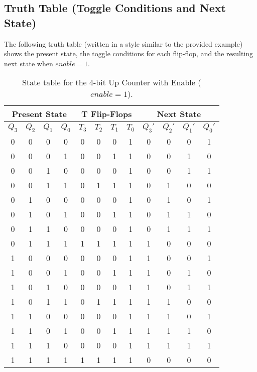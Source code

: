 \documentclass[11pt]{article}
\begin{document}
\subsection{Truth Table (Toggle Conditions and Next State)}
The following truth table (written in a style similar to the provided example) shows the present state, the toggle conditions for each flip-flop, and the resulting next state when \({enable}=1\).

\bigskip

\begin{table}[H]
\centering
\begin{tabular}{|c|c|c|c||c|c|c|c||c|c|c|c|}
\hline
\multicolumn{4}{|c||}{Present State} & \multicolumn{4}{c||}{T Flip-Flops} & \multicolumn{4}{c|}{Next State} \\
\hline
\(Q_3\) & \(Q_2\) & \(Q_1\) & \(Q_0\) & \(T_3\) & \(T_2\) & \(T_1\) & \(T_0\) & \(Q_3'\) & \(Q_2'\) & \(Q_1'\) & \(Q_0'\) \\
\hline
0 & 0 & 0 & 0 & 0 & 0 & 0 & 1 & 0 & 0 & 0 & 1 \\
\hline
0 & 0 & 0 & 1 & 0 & 0 & 1 & 1 & 0 & 0 & 1 & 0 \\
\hline
0 & 0 & 1 & 0 & 0 & 0 & 0 & 1 & 0 & 0 & 1 & 1 \\
\hline
0 & 0 & 1 & 1 & 0 & 1 & 1 & 1 & 0 & 1 & 0 & 0 \\
\hline
0 & 1 & 0 & 0 & 0 & 0 & 0 & 1 & 0 & 1 & 0 & 1 \\
\hline
0 & 1 & 0 & 1 & 0 & 0 & 1 & 1 & 0 & 1 & 1 & 0 \\
\hline
0 & 1 & 1 & 0 & 0 & 0 & 0 & 1 & 0 & 1 & 1 & 1 \\
\hline
0 & 1 & 1 & 1 & 1 & 1 & 1 & 1 & 1 & 0 & 0 & 0 \\
\hline
1 & 0 & 0 & 0 & 0 & 0 & 0 & 1 & 1 & 0 & 0 & 1 \\
\hline
1 & 0 & 0 & 1 & 0 & 0 & 1 & 1 & 1 & 0 & 1 & 0 \\
\hline
1 & 0 & 1 & 0 & 0 & 0 & 0 & 1 & 1 & 0 & 1 & 1 \\
\hline
1 & 0 & 1 & 1 & 0 & 1 & 1 & 1 & 1 & 1 & 0 & 0 \\
\hline
1 & 1 & 0 & 0 & 0 & 0 & 0 & 1 & 1 & 1 & 0 & 1 \\
\hline
1 & 1 & 0 & 1 & 0 & 0 & 1 & 1 & 1 & 1 & 1 & 0 \\
\hline
1 & 1 & 1 & 0 & 0 & 0 & 0 & 1 & 1 & 1 & 1 & 1 \\
\hline
1 & 1 & 1 & 1 & 1 & 1 & 1 & 1 & 0 & 0 & 0 & 0 \\
\hline
\end{tabular}
\caption{State table for the 4-bit Up Counter with Enable (\({enable}=1\)).}
\end{table}
\end{document}
